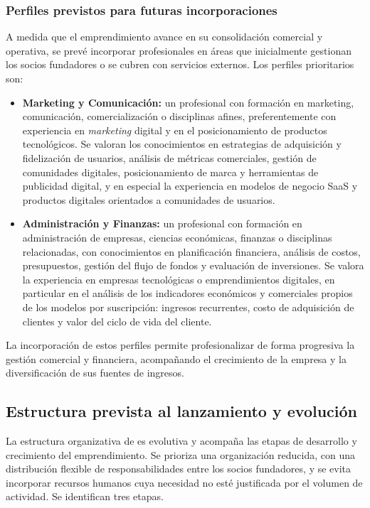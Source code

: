 \subsubsection{Perfiles previstos para futuras incorporaciones}
A medida que el emprendimiento avance en su consolidación comercial y operativa, se prevé incorporar profesionales en áreas que inicialmente gestionan los socios fundadores o se cubren con servicios externos. Los perfiles prioritarios son:
\begin{itemize}
  \item \textbf{Marketing y Comunicación:} un profesional con formación en marketing, comunicación, comercialización o disciplinas afines, preferentemente con experiencia en \textit{marketing} digital y en el posicionamiento de productos tecnológicos. Se valoran los conocimientos en estrategias de adquisición y fidelización de usuarios, análisis de métricas comerciales, gestión de comunidades digitales, posicionamiento de marca y herramientas de publicidad digital, y en especial la experiencia en modelos de negocio SaaS y productos digitales orientados a comunidades de usuarios.
  \item \textbf{Administración y Finanzas:} un profesional con formación en administración de empresas, ciencias económicas, finanzas o disciplinas relacionadas, con conocimientos en planificación financiera, análisis de costos, presupuestos, gestión del flujo de fondos y evaluación de inversiones. Se valora la experiencia en empresas tecnológicas o emprendimientos digitales, en particular en el análisis de los indicadores económicos y comerciales propios de los modelos por suscripción: ingresos recurrentes, costo de adquisición de clientes y valor del ciclo de vida del cliente.
\end{itemize}
La incorporación de estos perfiles permite profesionalizar de forma progresiva la gestión comercial y financiera, acompañando el crecimiento de la empresa y la diversificación de sus fuentes de ingresos.

\subsection{Estructura prevista al lanzamiento y evolución}
La estructura organizativa de \nombreproyecto{} es evolutiva y acompaña las etapas de desarrollo y crecimiento del emprendimiento. Se prioriza una organización reducida, con una distribución flexible de responsabilidades entre los socios fundadores, y se evita incorporar recursos humanos cuya necesidad no esté justificada por el volumen de actividad. Se identifican tres etapas.


